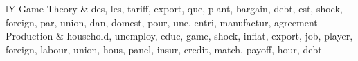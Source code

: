 \begin{table}[tb]
\caption[Groups]{The nine documents-group and the twenty most frequent words in each of them}
\label{tab:groups}
\begin{tabularx}{\hsize}{lY}
\toprule
\midrule
Game Theory & des, les, tariff, export, que, plant, bargain, debt, est, shock, foreign, par, union, dan, domest, pour, une, entri, manufactur, agreement \\
Production & household, unemploy, educ, game, shock, inflat, export, job, player, foreign, labour, union, hous, panel, insur, credit, match, payoff, hour, debt \\
\bottomrule
\end{tabularx}
\end{table}
